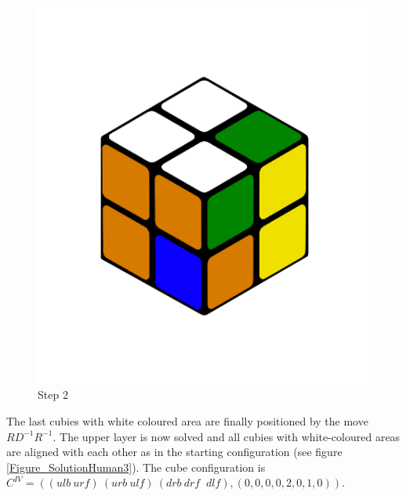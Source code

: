 \documentclass[12pt,a4paper]{article}
\theoremstyle{custom}
\begin{document}
\begin{figure}[H]
\centering
\includegraphics[scale=0.19]{images/Step2.png}
\caption{Step 2}
\label{Figure_SolutionHuman2}
\end{figure}

The last cubies with white coloured area are finally positioned by the move $RD^{-1}R^{-1}$. The upper layer is now solved and all cubies with white-coloured areas are aligned with each other as in the starting configuration (see figure \ref{Figure_SolutionHuman3}).
The cube configuration is $C^{IV}=(( \textit{ulb} \ \textit{urf} ) \ ( \textit{urb} \ \textit{ulf} ) \ ( \textit{drb} \ \textit{drf } \ \textit{dlf} ),(0,0,0,0,2,0,1,0))$.
\end{document}
